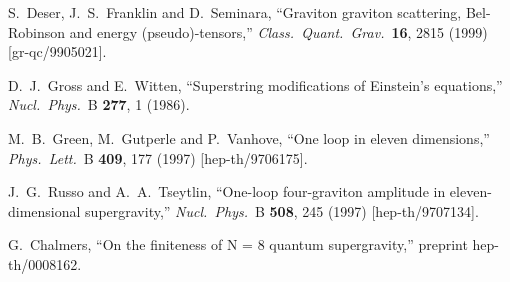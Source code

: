 \documentclass[12pt]{livrev}
\begin{document}
\begin{thebibliography}{99}
S.~Deser, J.~S.~Franklin and D.~Seminara,
``Graviton graviton scattering, Bel-Robinson and energy (pseudo)-tensors,''
{\it Class.\ Quant.\ Grav.}\  {\bf 16}, 2815 (1999)
[gr-qc/9905021].

D.~J.~Gross and E.~Witten,
``Superstring modifications of Einstein's equations,''
{\it Nucl.\ Phys.}\ B {\bf 277}, 1 (1986).

M.~B.~Green, M.~Gutperle and P.~Vanhove,
``One loop in eleven dimensions,''
{\it Phys.\ Lett.}\ B {\bf 409}, 177 (1997)
[hep-th/9706175].

J.~G.~Russo and A.~A.~Tseytlin,
``One-loop four-graviton amplitude in eleven-dimensional supergravity,''
{\it Nucl.\ Phys.}\ B {\bf 508}, 245 (1997)
[hep-th/9707134].

G.~Chalmers,
``On the finiteness of N = 8 quantum supergravity,''
preprint hep-th/0008162.

\end{thebibliography}
\end{document}
